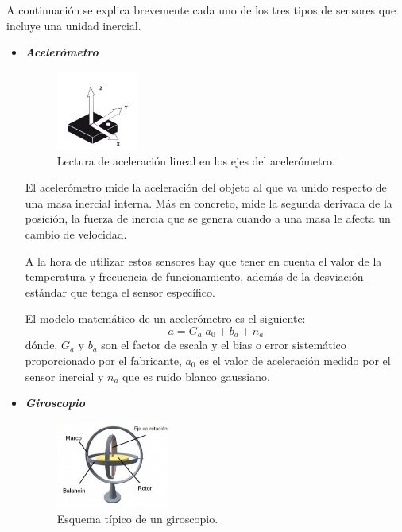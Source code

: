 A continuación se explica brevemente cada uno de los tres tipos de sensores que incluye una unidad inercial. \cite{juanDiego}

	\begin{itemize}
		\item \textit{\textbf{Acelerómetro}}	
		\begin{figure}[H]
			\centering
			\includegraphics[width=0.25\textwidth]{./img/IMUacelerometro}
			\caption{Lectura de aceleración lineal en los ejes del acelerómetro. \cite{juanDiego}} 
			\label{fig:IMUacelerometro}
		\end{figure} 
		
		El acelerómetro mide la aceleración del objeto al que va unido respecto de una masa inercial interna. Más en concreto, mide la segunda derivada de la posición, la fuerza de inercia que se genera cuando a una masa le afecta un cambio de velocidad.
		
		A la hora de utilizar estos sensores hay que tener en cuenta el valor de la temperatura y frecuencia de funcionamiento, además de la desviación estándar que tenga el sensor específico.
		
		El modelo matemático de un acelerómetro es el siguiente:
		\begin{equation}
			\label{eq:modeloAcelera}
			a = G_{a}\; a_{0} + b_{a} + n_{a}
		\end{equation}
		dónde, $ G_{a} $ y $ b_{a} $ son el factor de escala y el bias o error sistemático proporcionado por el fabricante, $ a_{0} $ es el valor de aceleración medido por el sensor inercial y $ n_{a} $ que es ruido blanco gaussiano.
		
	
		\item \textit{\textbf{Giroscopio}}	
		
		\begin{figure}[H]
			\centering
			\includegraphics[width=0.35\textwidth]{./img/IMUgiroscopo}
			\caption{Esquema típico de un giroscopio. \cite{juanDiego}} 
			\label{fig:IMUgiroscopo}
		\end{figure} 
		

\end{itemize}
